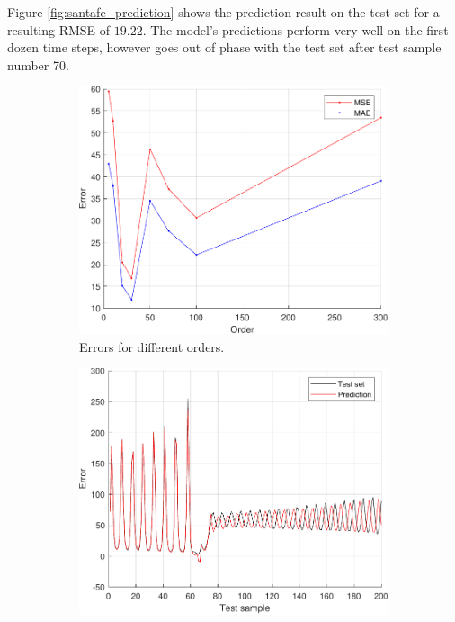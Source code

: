 \documentclass{article}
\begin{document}
        Figure \ref{fig:santafe_prediction} shows the prediction result on the test set for a resulting RMSE of $19.22$. The model's predictions perform very well on the first dozen time steps, however goes out of phase with the test set after test sample number 70.
        
        \begin{figure}[h]
             \centering
             \hspace{0.05\textwidth}
             \begin{subfigure}[b]{0.4\textwidth}
                 \centering
                 \includegraphics[width=\textwidth]{Assignment 2/figures/2_3/MSEvsMAE_ordersweep.pdf}
                 \caption{Errors for different orders.}
                 \label{fig:order_sweep_santa_fe}
             \end{subfigure}
             \hfill
             \begin{subfigure}[b]{0.4\textwidth}
                 \centering
                 \includegraphics[width=\textwidth]{Assignment 2/figures/2_3/prediction_order_20.pdf}

\end{subfigure}
\end{figure}
\end{document}
